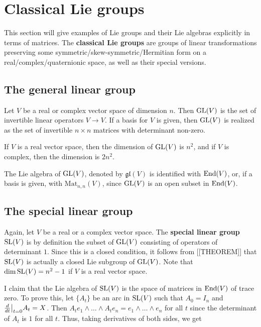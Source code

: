 \documentclass[11pt, english]{article}
\begin{document}
\newpage
\section{Classical Lie groups}

This section will give examples of Lie groups and their Lie algebras explicitly in terms of matrices. The \textbf{classical Lie groups} are groups of linear transformations preserving some symmetric/skew-symmetric/Hermitian form on a real/complex/quaternionic space, as well as their special versions. 

\subsection{The general linear group}

Let $V$ be a real or complex vector space of dimension $n$. Then $\operatorname{GL}(V)$ is the set of invertible linear operators $V \to V$. If a basis for $V$ is given, then $\operatorname{GL}(V)$ is realized as the set of invertible $n \times n$ matrices with determinant non-zero.

If $V$ is a real vector space, then the dimension of $\operatorname{GL}(V)$ is $n^2$, and if $V$ is complex, then the dimension is $2n^2$. 

The Lie algebra of $\operatorname{GL}(V)$, denoted by $\mathfrak {gl}(V)$ is identified with $\operatorname{End}(V)$, or, if a basis is given, with $\mathrm{Mat}_{n,n}(V)$, since $\operatorname{GL}(V)$ is an open subset in $\operatorname{End}(V)$.

\subsection{The special linear group}

Again, let $V$ be a real or a complex vector space. The \textbf{special linear group} $\operatorname{SL}(V)$ is by definition the subset of $\operatorname{GL}(V)$ consisting of operators of determinant $1$. Since this is a closed condition, it follows from [[THEOREM]] that $\operatorname{SL}(V)$ is actually a closed Lie subgroup of $\operatorname{GL}(V)$. Note that $\dim \operatorname{SL}(V) = n^2-1$ if $V$ is a real vector space.

I claim that the Lie algebra of $\operatorname{SL}(V)$ is the space of matrices in $\operatorname{End}(V)$ of trace zero. To prove this, let $\{ A_t \}$ be an arc in $\operatorname{SL}(V)$ such that $A_0 = I_n$ and $\restr{\frac{d}{dt}}{t=0} A_t =X$. Then $A_t e_1 \wedge \ldots  \wedge A_t e_n = e_1 \wedge \ldots \wedge e_n$ for all $t$ since the determinant of $A_t$ is $1$ for all $t$. Thus, taking derivatives of both sides, we get
\end{document}
